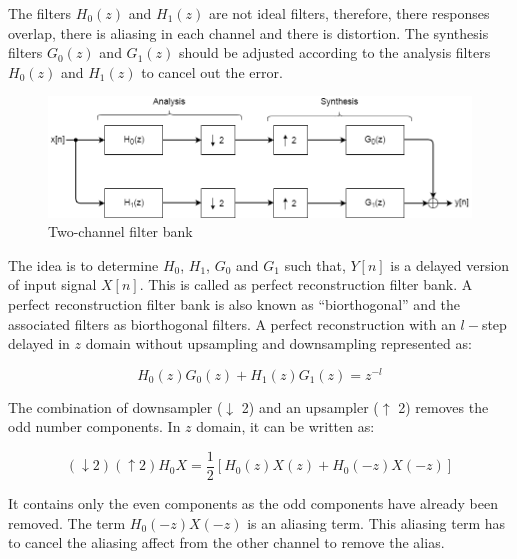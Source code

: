The filters ${H_{0}(z)}$ and ${H_{1}(z)}$ are not ideal filters, therefore, there responses overlap, there is aliasing in each channel and there is distortion. The synthesis filters ${G_{0}(z)}$ and ${G_{1}(z)}$ should be adjusted according to the analysis filters ${H_{0}(z)}$ and ${H_{1}(z)}$ to cancel out the error.



\begin{figure}[h]
	\centering
	\includegraphics[width=160mm]{images/2_channel_filter_bank}
	\caption{Two-channel filter bank}
	\label{fig:2_channel_filter_bank}
\end{figure}



The idea is to determine $H_0$, $H_1$, $G_0$ and $G_1$ such that, $Y[n]$ is a delayed version of input signal $X[n]$. This is called as perfect reconstruction filter bank. A perfect reconstruction filter bank is also known as ``biorthogonal'' and the associated filters as biorthogonal filters. A perfect reconstruction with an $l-$step delayed in $z$ domain without upsampling and downsampling represented as:


\begin{equation} \label{eqn:basic_tr}
{H_{0}(z)G_{0}(z) + H_{1}(z)G_{1}(z) = z^{-l}}
\end{equation}


The combination of downsampler ($\downarrow$ 2) and an upsampler ($\uparrow$ 2) removes the odd number components. In $z$ domain, it can be written as:

\begin{equation} \label{eqn_wavelet_transform}
{(\downarrow 2)(\uparrow 2)H_{0}X = \frac{1}{2}[H_{0}(z)X(z) + H_{0}(-z)X(-z)]}
\end{equation}
 
It contains only the even components as the odd components have already been removed. The term $H_{0}(-z)X(-z)$ is an aliasing term. This aliasing term has to cancel the aliasing affect from the other channel to remove the alias.


